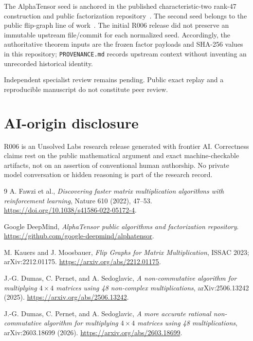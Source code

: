 \documentclass[11pt]{article}
\begin{document}
The AlphaTensor seed is anchored in the published characteristic-two rank-47 construction and public factorization repository~\cite{alphatensor,alphatensorcode}. The second seed belongs to the public flip-graph line of work~\cite{flipgraphs}. The initial R006 release did not preserve an immutable upstream file/commit for each normalized seed. Accordingly, the authoritative theorem inputs are the frozen factor payloads and SHA-256 values in this repository; \texttt{PROVENANCE.md} records upstream context without inventing an unrecorded historical identity.

Independent specialist review remains pending. Public exact replay and a reproducible manuscript do not constitute peer review.

\section*{AI-origin disclosure}
R006 is an Unsolved Labs research release generated with frontier AI. Correctness claims rest on the public mathematical argument and exact machine-checkable artifacts, not on an assertion of conventional human authorship. No private model conversation or hidden reasoning is part of the research record.

\begin{thebibliography}{9}
A. Fawzi et al., \emph{Discovering faster matrix multiplication algorithms with reinforcement learning}, Nature 610 (2022), 47--53. \url{https://doi.org/10.1038/s41586-022-05172-4}.

Google DeepMind, \emph{AlphaTensor public algorithms and factorization repository}. \url{https://github.com/google-deepmind/alphatensor}.

M. Kauers and J. Moosbauer, \emph{Flip Graphs for Matrix Multiplication}, ISSAC 2023; arXiv:2212.01175. \url{https://arxiv.org/abs/2212.01175}.

J.-G. Dumas, C. Pernet, and A. Sedoglavic, \emph{A non-commutative algorithm for multiplying $4\times4$ matrices using 48 non-complex multiplications}, arXiv:2506.13242 (2025). \url{https://arxiv.org/abs/2506.13242}.

J.-G. Dumas, C. Pernet, and A. Sedoglavic, \emph{A more accurate rational non-commutative algorithm for multiplying $4\times4$ matrices using 48 multiplications}, arXiv:2603.18699 (2026). \url{https://arxiv.org/abs/2603.18699}.
\end{thebibliography}
\end{document}
